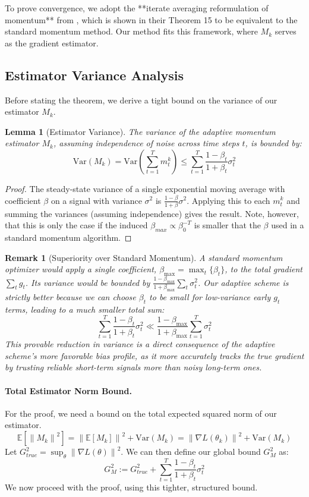 \documentclass{article}
\newtheorem{lemma}{Lemma}
\newtheorem{remark}{Remark}
\newcommand{\E}{\mathbb{E}}
\newcommand{\norm}[1]{\left\lVert#1\right\rVert}
\newcommand{\grad}{\nabla}
\begin{document}
To prove convergence, we adopt the **iterate averaging reformulation of momentum** from \citet{DeFazio and Gower (2020)}, which is shown in their Theorem 15 to be equivalent to the standard momentum method. Our method fits this framework, where \(M_k\) serves as the gradient estimator.

\subsection{Estimator Variance Analysis}

Before stating the theorem, we derive a tight bound on the variance of our estimator \(M_k\).

\begin{lemma}[Estimator Variance]
The variance of the adaptive momentum estimator \(M_k\), assuming independence of noise across time steps \(t\), is bounded by:
\[ \text{Var}(M_k) = \text{Var}\left(\sum_{t=1}^T m_t^k\right) \le \sum_{t=1}^T \frac{1-\beta_t}{1+\beta_t}\sigma_t^2 \]
\end{lemma}
\begin{proof}
The steady-state variance of a single exponential moving average with coefficient \(\beta\) on a signal with variance \(\sigma^2\) is \(\frac{1-\beta}{1+\beta}\sigma^2\). Applying this to each \(m_t^k\) and summing the variances (assuming independence) gives the result. Note, however, that this is only the case if the induced $\beta_{max} \propto \beta_0^{-T}$ is smaller that the $\beta$ used in a standard momentum algorithm.
\end{proof}

\begin{remark}[Superiority over Standard Momentum]
A standard momentum optimizer would apply a single coefficient, \(\beta_{\max} = \max_t\{\beta_t\}\), to the total gradient \(\sum_t g_t\). Its variance would be bounded by \(\frac{1-\beta_{\max}}{1+\beta_{\max}} \sum_t \sigma_t^2\). Our adaptive scheme is strictly better because we can choose \(\beta_t\) to be small for low-variance early \(g_t\) terms, leading to a much smaller total sum:
\[ \sum_{t=1}^T \frac{1-\beta_t}{1+\beta_t}\sigma_t^2 \ll \frac{1-\beta_{\max}}{1+\beta_{\max}} \sum_{t=1}^T \sigma_t^2 \]
This provable reduction in variance is a direct consequence of the adaptive scheme's more favorable bias profile, as it more accurately tracks the true gradient by trusting reliable short-term signals more than noisy long-term ones.
\end{remark}

\paragraph{Total Estimator Norm Bound.}
For the proof, we need a bound on the total expected squared norm of our estimator.
\[ \E[\norm{M_k}^2] = \norm{\E[M_k]}^2 + \text{Var}(M_k) = \norm{\grad L(\theta_k)}^2 + \text{Var}(M_k) \]
Let \(G^2_{true} = \sup_\theta \norm{\grad L(\theta)}^2\). We can then define our global bound \(G_M^2\) as:
\[ G_M^2 := G^2_{true} + \sum_{t=1}^T \frac{1-\beta_t}{1+\beta_t}\sigma_t^2 \]
We now proceed with the proof, using this tighter, structured bound.
\end{document}
